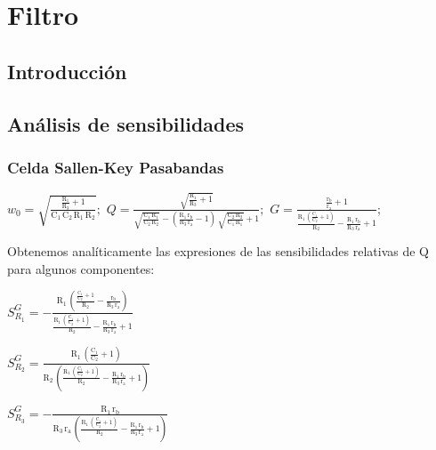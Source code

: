 \documentclass[../tc_tpfinal_main.tex]{subfiles}
\begin{document}
\chapter{Filtro}

\section{Introducción}

\section{Análisis de sensibilidades}
\subsection{Celda Sallen-Key Pasabandas}
\begin{center}
$w_0 = \sqrt{\frac{\frac{\mathrm{R_1}}{\mathrm{R_3}} + 1}{\mathrm{C_1}\, \mathrm{C_2}\, \mathrm{R_1}\, \mathrm{R_2}}}
;$
$Q = \frac{\sqrt{\frac{\mathrm{R_1}}{\mathrm{R_3}} + 1}}{\sqrt{\frac{\mathrm{C_1}\, \mathrm{R_1}}{\mathrm{C_2}\, \mathrm{R_2}}} - \left(\frac{\mathrm{R_1}\, \mathrm{r_b}}{\mathrm{R_3}\, \mathrm{r_a}} - 1\right)\, \sqrt{\frac{\mathrm{C_2}\, \mathrm{R_2}}{\mathrm{C_1}\, \mathrm{R_1}}} + 1}
;$
$G = \frac{\frac{\mathrm{r_b}}{\mathrm{r_a}} + 1}{\frac{\mathrm{R_1}\, \left(\frac{\mathrm{C_1}}{\mathrm{C_2}} + 1\right)}{\mathrm{R_2}} - \frac{\mathrm{R_1}\, \mathrm{r_b}}{\mathrm{R_3}\, \mathrm{r_a}} + 1}
;$
\end{center}

Obtenemos analíticamente las expresiones de las sensibilidades relativas de Q para algunos componentes: \par

$S^{G}_{R_1} = -\frac{\mathrm{R_1}\, \left(\frac{\frac{\mathrm{C_1}}{\mathrm{C_2}} + 1}{\mathrm{R_2}} - \frac{\mathrm{r_b}}{\mathrm{R_3}\, \mathrm{r_a}}\right)}{\frac{\mathrm{R_1}\, \left(\frac{\mathrm{C_1}}{\mathrm{C_2}} + 1\right)}{\mathrm{R_2}} - \frac{\mathrm{R_1}\, \mathrm{r_b}}{\mathrm{R_3}\, \mathrm{r_a}} + 1}$\par

$S^{G}_{R_2} = \frac{\mathrm{R_1}\, \left(\frac{\mathrm{C_1}}{\mathrm{C_2}} + 1\right)}{\mathrm{R_2}\, \left(\frac{\mathrm{R_1}\, \left(\frac{\mathrm{C_1}}{\mathrm{C_2}} + 1\right)}{\mathrm{R_2}} - \frac{\mathrm{R_1}\, \mathrm{r_b}}{\mathrm{R_3}\, \mathrm{r_a}} + 1\right)}$\par

$S^{G}_{R_3} = -\frac{\mathrm{R_1}\, \mathrm{r_b}}{\mathrm{R_3}\, \mathrm{r_a}\, \left(\frac{\mathrm{R_1}\, \left(\frac{\mathrm{C_1}}{\mathrm{C_2}} + 1\right)}{\mathrm{R_2}} - \frac{\mathrm{R_1}\, \mathrm{r_b}}{\mathrm{R_3}\, \mathrm{r_a}} + 1\right)}$\par
\end{document}
